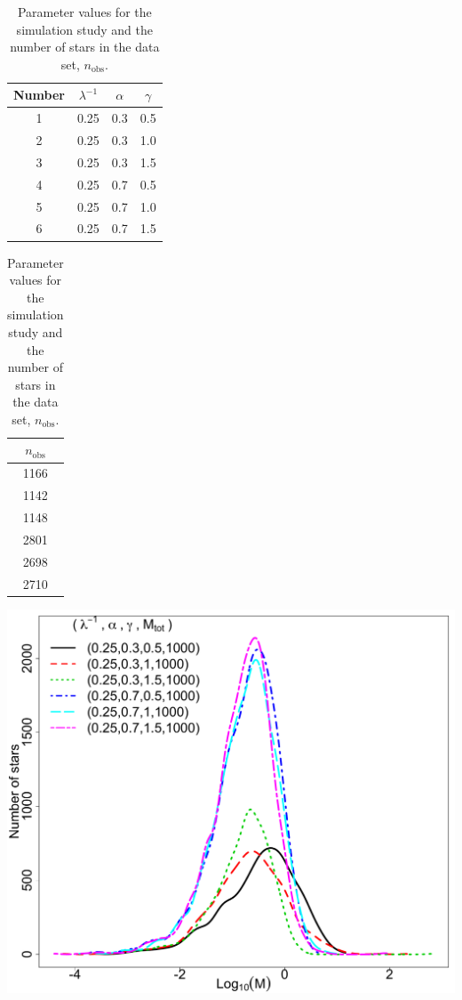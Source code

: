 \documentclass[ejs]{imsart}
\numberwithin{equation}{section}
\theoremstyle{plain}
\newcommand{\nobs}{n_{\text{obs}}}
\begin{document}
\begin{table}[htbp]
\begin{minipage}[b]{0.43\linewidth}
\centering
   \begin{tabular}{|c|c|c|c|} %
   \hline
   Number & $\lambda^{-1}$ & $\alpha$ & $\gamma$  \\
   \hline
1	&	0.25	&	0.3	&	0.5	 \\
2	&	0.25	&	0.3	&	1.0	 \\
3	&	0.25	&	0.3	&	1.5	 \\
4	&	0.25	&	0.7	&	0.5	 \\
5	&	0.25	&	0.7	&	1.0	\\
6	&	0.25	&	0.7	&	1.5	 \\
\hline
   \end{tabular}
   \begin{tabular}{|c|} %
   \hline
 $\nobs$ \\
   \hline
1166	 \\
1142	 \\
1148	 \\
2801	 \\
2698	 \\
2710	 \\
\hline
   \end{tabular}
   \caption{Parameter values for the simulation study and the number of stars in the data set, $\nobs$.}
   \label{tab:sim_study}
\end{minipage}\hfill
\begin{minipage}[b]{0.56\linewidth}
\centering
\includegraphics[width = .65\textwidth]{figures/sim_study_true_imf.pdf} 
   \label{fig:true_imf}
\end{minipage}
\end{table}
\end{document}
